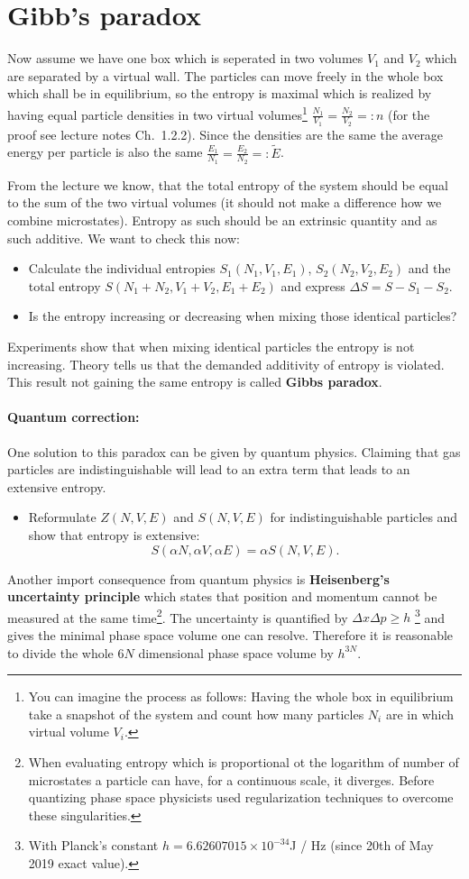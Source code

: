 \documentclass[12pt,a4paper]{article} %
\begin{document}
 \section{Gibb's paradox}
 Now assume we have one box which is seperated in two volumes $V_1$ and $V_2$ which are separated by a virtual wall. The particles can move freely in the whole box which shall be in equilibrium, so the entropy is maximal which is realized by having equal particle densities in two virtual volumes\footnote{You can imagine the process as follows: Having the whole box in equilibrium take a snapshot of the system and count how many particles $N_i$ are in which virtual volume $V_i$.} $\frac{N_1}{V_1} = \frac{N_2}{V_2} =: n$ (for the proof see lecture notes Ch.~1.2.2). Since the densities are the same the average energy per particle is also the same $\frac{E_1}{N_1} = \frac{E_2}{N_2} =: \tilde{E}$.
 
 From the lecture we know, that the total entropy of the system should be equal to the sum of the two virtual volumes (it should not make a difference how we combine microstates). Entropy as such should be an extrinsic quantity and as such additive. We want to check this now:
 \begin{itemize}
  \item Calculate the individual entropies $S_1(N_1,V_1, E_1)$, $S_2(N_2,V_2,E_2)$ and the total entropy $S(N_1+N_2, V_1+V_2, E_1 + E_2)$ and express $\Delta S = S - S_1 - S_2$.
  \item Is the entropy increasing or decreasing when mixing those identical particles?
 \end{itemize}
 Experiments show that when mixing identical particles the entropy is not increasing. Theory tells us that the demanded additivity of entropy is violated. This result not gaining the same entropy is called \textbf{Gibbs paradox}.
 \paragraph{Quantum correction:} One solution to this paradox can be given by quantum physics. Claiming that gas particles are indistinguishable will lead to an extra term that leads to an extensive entropy.
 \begin{itemize}
  \item Reformulate $Z(N,V,E)$ and $S(N,V,E)$ for indistinguishable particles and show that entropy is extensive: 
  $$S(\alpha N, \alpha V, \alpha E) = \alpha S(N,V,E) .$$ 
 \end{itemize}
Another import consequence from quantum physics is \textbf{Heisenberg's uncertainty principle} which states that position and momentum cannot be measured at the same time\footnote{When evaluating entropy which is proportional ot the logarithm of number of microstates a particle can have, for a continuous scale, it diverges. Before quantizing phase space physicists used regularization techniques to overcome these singularities.}. The uncertainty is quantified by $ \Delta x \Delta p \geq h$ \footnote{With Planck's constant $h = 6.62607015 \times 10^{-34}$J / Hz (since 20th of May 2019 exact value).} and gives the minimal phase space volume one can resolve. Therefore it is reasonable to divide the whole $6N$ dimensional phase space volume by $h^{3N}$.
\end{document}

